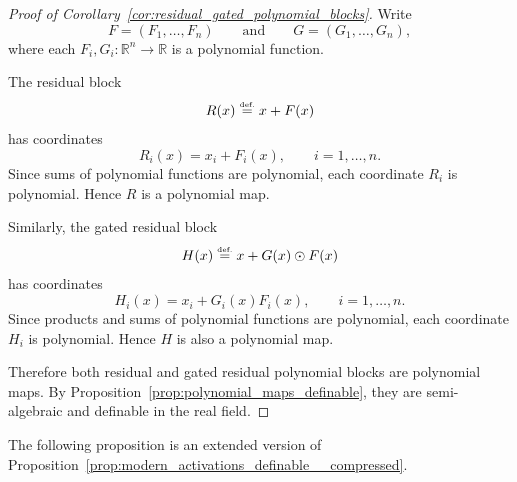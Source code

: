 \documentclass{article}
\newcommand{\eqdef}{\ensuremath{\stackrel{\mbox{\upshape\tiny def.}}{=}}}
\theoremstyle{plain}
\theoremstyle{definition}
\theoremstyle{remark}
\theoremstyle{plain}
\numberwithin{thm}{section}
\theoremstyle{definition}
\numberwithin{equation}{section}
\begin{document}
\begin{proof}[Proof of Corollary~\ref{cor:residual_gated_polynomial_blocks}]
Write
\[
    F=(F_1,\dots,F_n)
    \qquad\text{and}\qquad
    G=(G_1,\dots,G_n),
\]
where each $F_i,G_i:\mathbb{R}^n\to\mathbb{R}$ is a polynomial function.

The residual block
\[
    R(x)\eqdef x+F(x)
\]
has coordinates
\[
    R_i(x)=x_i+F_i(x),\qquad i=1,\dots,n.
\]
Since sums of polynomial functions are polynomial, each coordinate $R_i$ is polynomial. Hence $R$ is a polynomial map.

Similarly, the gated residual block
\[
    H(x)\eqdef x+G(x)\odot F(x)
\]
has coordinates
\[
    H_i(x)=x_i+G_i(x)F_i(x),\qquad i=1,\dots,n.
\]
Since products and sums of polynomial functions are polynomial, each coordinate $H_i$ is polynomial. Hence $H$ is also a polynomial map.

Therefore both residual and gated residual polynomial blocks are polynomial maps. By Proposition~\ref{prop:polynomial_maps_definable}, they are semi-algebraic and definable in the real field.
\end{proof}

The following proposition is an extended version of Proposition~\ref{prop:modern_activations_definable__compressed}.
\end{document}
